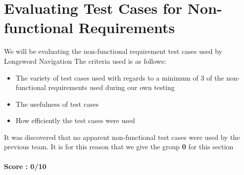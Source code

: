 \section{Evaluating Test Cases for Non-functional Requirements}
We will be evaluating the non-functional requirement test cases used by Longsword Navigation
The criteria used is as follows:
\begin{itemize}  
\item The variety of test cases used with regards to a minimum of 3 of the non-functional requirements used during our own testing
\item The usefulness of test cases
\item How efficiently the test cases were used 
\end{itemize}
It was discovered that no apparent non-functional test cases were used by the previous team. It is for this reason that we give the group \textbf{0} for this section \\\\
\textbf{Score : 0/10}
